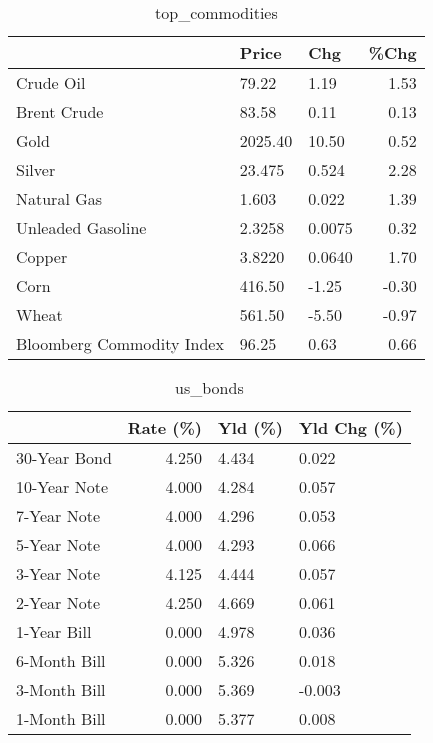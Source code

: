 \documentclass{article}%
\begin{document}
\begin{table}[htbp]%
\caption{top\_commodities}%
\centering%
\begin{adjustbox}{width=1\textwidth}%
\begin{tabular}{lllr}
\toprule
                          &   Price &    Chg &  \%Chg \\
\midrule
               Crude Oil  &   79.22 &   1.19 &  1.53 \\
             Brent Crude  &   83.58 &   0.11 &  0.13 \\
                    Gold  & 2025.40 &  10.50 &  0.52 \\
                  Silver  &  23.475 &  0.524 &  2.28 \\
             Natural Gas  &   1.603 &  0.022 &  1.39 \\
       Unleaded Gasoline  &  2.3258 & 0.0075 &  0.32 \\
                  Copper  &  3.8220 & 0.0640 &  1.70 \\
                    Corn  &  416.50 &  -1.25 & -0.30 \\
                   Wheat  &  561.50 &  -5.50 & -0.97 \\
Bloomberg Commodity Index &   96.25 &   0.63 &  0.66 \\
\bottomrule
\end{tabular}
%
\end{adjustbox}%
\end{table}

%


\begin{table}[htbp]%
\caption{us\_bonds}%
\centering%
\begin{adjustbox}{width=1\textwidth}%
\begin{tabular}{lrll}
\toprule
             &  Rate (\%) & Yld (\%) & Yld Chg (\%) \\
\midrule
30-Year Bond &     4.250 &   4.434 &       0.022 \\
10-Year Note &     4.000 &   4.284 &       0.057 \\
 7-Year Note &     4.000 &   4.296 &       0.053 \\
 5-Year Note &     4.000 &   4.293 &       0.066 \\
 3-Year Note &     4.125 &   4.444 &       0.057 \\
 2-Year Note &     4.250 &   4.669 &       0.061 \\
 1-Year Bill &     0.000 &   4.978 &       0.036 \\
6-Month Bill &     0.000 &   5.326 &       0.018 \\
3-Month Bill &     0.000 &   5.369 &      -0.003 \\
1-Month Bill &     0.000 &   5.377 &       0.008 \\
\bottomrule
\end{tabular}
%
\end{adjustbox}%
\end{table}
\end{document}
